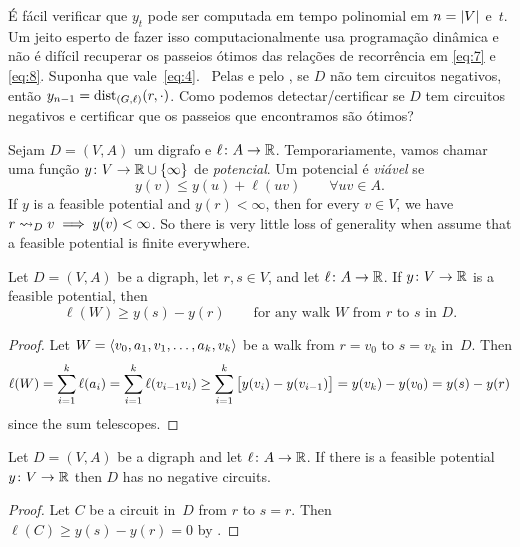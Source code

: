 \documentclass[10pt,reqno]{amsart}
\begin{document}
É fácil verificar que \(y_t\) pode ser computada em tempo polinomial em
\(n = \card{V}\) e~\(t\).  Um jeito esperto de fazer isso computacionalmente
usa programação dinâmica e não é difícil recuperar os passeios ótimos das 
relações de recorrência em \eqref{eq:7} e \eqref{eq:8}.
Suponha que vale~\eqref{eq:4}.  Pelas 
e pelo , se \(D\) não tem circuitos negativos, então
\(y_{n-1} = \dist_{(G,\ell)}(r,\cdot)\).  Como podemos detectar/certificar
se \(D\) tem circuitos negativos e certificar que os passeios que encontramos
são ótimos?

Sejam \(D = (V,A)\) um digrafo e \(\ell \colon A \to \Reals\).
Temporariamente, vamos chamar uma função
\(y \colon V \to \Reals \cup \set{\infty}\) de \emph{potencial}.  Um
potencial é \emph{viável} se
\begin{equation*}
  y(v) \leq y(u) + \ell(uv)
  \qquad
  \forall uv \in A.
\end{equation*}
If \(y\) is a feasible potential and \(y(r) < \infty\), then for every
\(v \in V\), we have \(r \reaches_D v \implies y(v) < \infty\).  So
there is very little loss of generality when assume that a feasible
potential is finite everywhere.

\begin{theorem}
  \label{thm:1}
  Let \(D = (V,A)\) be a digraph, let \(r,s \in V\), and let
  \(\ell \colon A \to \Reals\).  If \(y \colon V \to \Reals\) is a
  feasible potential, then
  \begin{equation}
    \label{eq:11}
    \ell(W) \geq y(s) - y(r)
    \qquad
    \text{for any walk~\(W\) from~\(r\) to~\(s\) in~\(D\)}.
  \end{equation}
\end{theorem}
\begin{proof}
  Let \(W = \seq{v_0,a_1,v_1,\dotsc,a_k,v_k}\) be a walk from
  \(r = v_0\) to \(s = v_k\) in~\(D\).  Then
  \begin{equation*}
    \ell(W)
    =
    \sum_{i=1}^k \ell(a_i)
    =
    \sum_{i=1}^k \ell(v_{i-1}v_i)
    \geq
    \sum_{i=1}^k \sqbrac[\big]{y(v_i)-y(v_{i-1})}
    =
    y(v_k) - y(v_0)
    =
    y(s) - y(r)
  \end{equation*}
  since the sum telescopes.
\end{proof}

\begin{corollary}
  Let \(D = (V,A)\) be a digraph and let \(\ell \colon A \to \Reals\).
  If there is a feasible potential \(y \colon V \to \Reals\) then
  \(D\) has no negative circuits.
\end{corollary}
\begin{proof}
  Let \(C\) be a circuit in~\(D\) from \(r\) to \(s = r\).  Then
  \(\ell(C) \geq y(s) - y(r) = 0\) by .
\end{proof}
\end{document}
